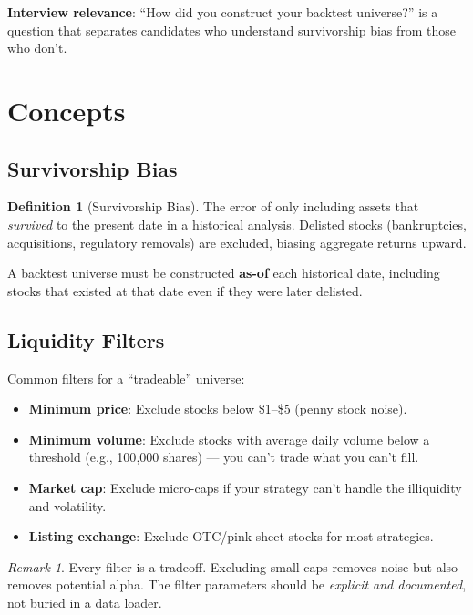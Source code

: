 \documentclass[a4paper, 11pt]{report}
\theoremstyle{definition}
\newtheorem{definition}{Definition}[chapter]
\theoremstyle{remark}
\newtheorem{remark}{Remark}[chapter]
\begin{document}
\textbf{Interview relevance}: ``How did you construct your backtest universe?'' is
a question that separates candidates who understand survivorship bias from those
who don't.

\section{Concepts}

\subsection{Survivorship Bias}

\begin{definition}[Survivorship Bias]
    The error of only including assets that \emph{survived} to the present date in
    a historical analysis.  Delisted stocks (bankruptcies, acquisitions,
    regulatory removals) are excluded, biasing aggregate returns upward.

    A backtest universe must be constructed \textbf{as-of} each historical date,
    including stocks that existed at that date even if they were later delisted.
\end{definition}

\subsection{Liquidity Filters}

Common filters for a ``tradeable'' universe:

\begin{itemize}
    \item \textbf{Minimum price}: Exclude stocks below \$1--\$5 (penny stock noise).
    \item \textbf{Minimum volume}: Exclude stocks with average daily volume below
          a threshold (e.g., 100{,}000 shares) --- you can't trade what you can't
          fill.
    \item \textbf{Market cap}: Exclude micro-caps if your strategy can't handle
          the illiquidity and volatility.
    \item \textbf{Listing exchange}: Exclude OTC/pink-sheet stocks for most
          strategies.
\end{itemize}

\begin{remark}
    Every filter is a tradeoff.  Excluding small-caps removes noise but also
    removes potential alpha.  The filter parameters should be \emph{explicit and
    documented}, not buried in a data loader.
\end{remark}
\end{document}
